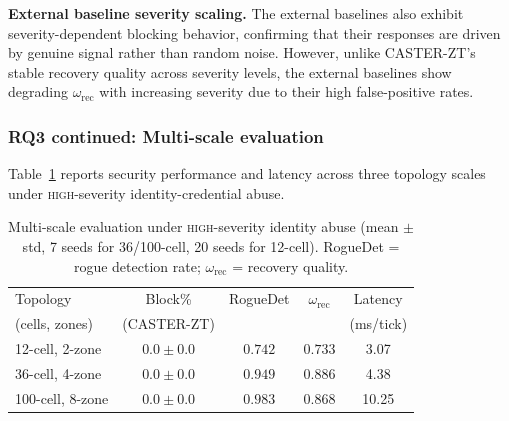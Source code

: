 \documentclass[10pt,journal,compsoc]{IEEEtran}
\begin{document}
\noindent\textbf{External baseline severity scaling.}
The external baselines also exhibit severity-dependent blocking behavior, confirming that their responses are driven by genuine signal rather than random noise.
However, unlike CASTER-ZT's stable recovery quality across severity levels, the external baselines show degrading $\omega_{\mathrm{rec}}$ with increasing severity due to their high false-positive rates.

\subsubsection{RQ3 continued: Multi-scale evaluation}

Table~\ref{tab:multiscale} reports security performance and latency across three topology scales under \textsc{high}-severity identity-credential abuse.

\begin{table}[t]
\centering
\caption{Multi-scale evaluation under \textsc{high}-severity identity abuse (mean $\pm$ std, 7 seeds for 36/100-cell, 20 seeds for 12-cell).  RogueDet = rogue detection rate; $\omega_{\mathrm{rec}}$ = recovery quality.}
\label{tab:multiscale}
\begin{tabular}{lcccc}
\toprule
Topology & Block\% & RogueDet & $\omega_{\mathrm{rec}}$ & Latency \\
(cells, zones) & (CASTER-ZT) & & & (ms/tick) \\
\midrule
12-cell, 2-zone   & $0.0\pm0.0$  & $0.742$ & $0.733$ & 3.07 \\
36-cell, 4-zone   & $0.0\pm0.0$ & $0.949$ & $0.886$ & 4.38 \\
100-cell, 8-zone  & $0.0\pm0.0$ & $0.983$ & $0.868$ & 10.25 \\
\bottomrule
\end{tabular}
\end{table}
\end{document}
